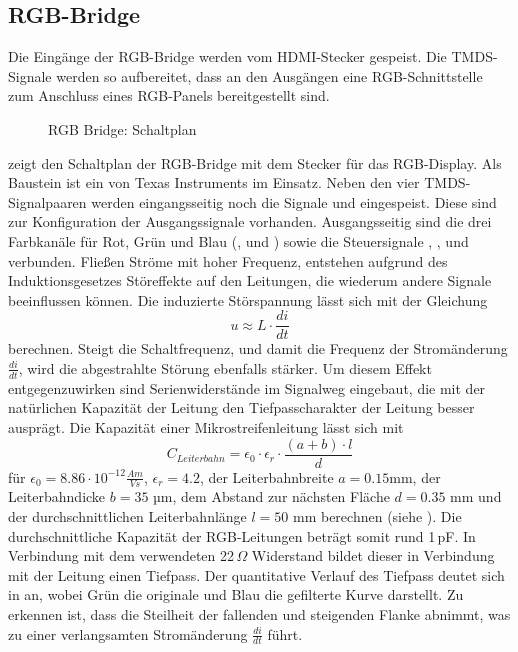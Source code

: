 \subsection{RGB-Bridge}
Die Eingänge der RGB-Bridge werden vom HDMI-Stecker gespeist. Die TMDS-Signale werden so aufbereitet, dass an den Ausgängen eine RGB-Schnittstelle zum Anschluss eines RGB-Panels bereitgestellt sind.
        \begin{figure}[htp]
        	\center
            \caption{RGB Bridge: Schaltplan}
            \label{fig:teilb_rgb_bridge_sch}
        \end{figure}
\newline        
{} zeigt den Schaltplan der RGB-Bridge mit dem Stecker für das RGB-Display. Als Baustein ist ein  von Texas Instruments im Einsatz. Neben den vier TMDS-Signalpaaren werden eingangsseitig noch die Signale  und  eingespeist. Diese sind zur Konfiguration der Ausgangssignale vorhanden. Ausgangsseitig sind die drei Farbkanäle für Rot, Grün und Blau (,  und ) sowie die Steuersignale , ,  und  verbunden.
Fließen Ströme mit hoher Frequenz, entstehen aufgrund des Induktionsgesetzes Störeffekte auf den Leitungen, die wiederum andere Signale beeinflussen können. Die induzierte Störspannung lässt sich mit der Gleichung
%
\begin{equation}
u \approx L \cdot \frac{di}{dt}
\label{equ:induzierte_spannung}
\end{equation}
%
berechnen. Steigt die Schaltfrequenz, und damit die Frequenz der Stromänderung $\frac{di}{dt}$, wird die abgestrahlte Störung ebenfalls stärker. Um diesem Effekt entgegenzuwirken sind Serienwiderstände im Signalweg eingebaut, die mit der natürlichen Kapazität der Leitung den Tiefpasscharakter der Leitung besser ausprägt. Die Kapazität einer Mikrostreifenleitung lässt sich mit 
%
\begin{equation}
C_{Leiterbahn} = \epsilon_0 \cdot \epsilon_r \cdot \frac{(a+b) \cdot l}{d}
\label{equ:c_leiterbahn}
\end{equation}
%
für $\epsilon_0 = 8.86\cdot10^{-12} \frac{Am}{Vs}$, $\epsilon_r = 4.2$, der Leiterbahnbreite $a = 0.15 $mm, der Leiterbahndicke $b = 35$ µm, dem Abstand zur nächsten Fläche $d = 0.35$ mm und der durchschnittlichen Leiterbahnlänge $l = 50$ mm berechnen (siehe \cite{Gensicke2014}). Die durchschnittliche Kapazität der RGB-Leitungen beträgt somit rund 1\,pF. In Verbindung mit dem verwendeten 22\,$\Omega$ Widerstand bildet dieser in Verbindung mit der Leitung einen Tiefpass. Der quantitative Verlauf des Tiefpass deutet sich in  an, wobei Grün die originale und Blau die gefilterte Kurve darstellt. Zu erkennen ist, dass die Steilheit der fallenden und steigenden Flanke abnimmt, was zu einer verlangsamten Stromänderung $\frac{di}{dt}$ führt.
